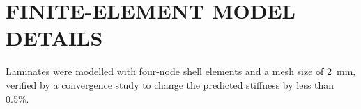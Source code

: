 \chapter{FINITE-ELEMENT MODEL DETAILS}
\label{app:a}

Laminates were modelled with four-node shell elements and a mesh size of 2~mm, verified by a
convergence study to change the predicted stiffness by less than 0.5\%.
